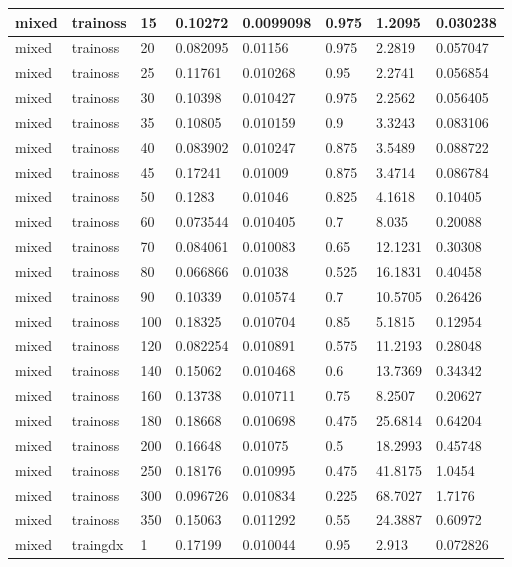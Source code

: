 \begin{longtable}{llllllll}
mixed & trainoss & 15 & 0.10272 & 0.0099098 & 0.975 & 1.2095 & 0.030238 \\ \hline 
mixed & trainoss & 20 & 0.082095 & 0.01156 & 0.975 & 2.2819 & 0.057047 \\ \hline 
mixed & trainoss & 25 & 0.11761 & 0.010268 & 0.95 & 2.2741 & 0.056854 \\ \hline 
mixed & trainoss & 30 & 0.10398 & 0.010427 & 0.975 & 2.2562 & 0.056405 \\ \hline 
mixed & trainoss & 35 & 0.10805 & 0.010159 & 0.9 & 3.3243 & 0.083106 \\ \hline 
mixed & trainoss & 40 & 0.083902 & 0.010247 & 0.875 & 3.5489 & 0.088722 \\ \hline 
mixed & trainoss & 45 & 0.17241 & 0.01009 & 0.875 & 3.4714 & 0.086784 \\ \hline 
mixed & trainoss & 50 & 0.1283 & 0.01046 & 0.825 & 4.1618 & 0.10405 \\ \hline 
mixed & trainoss & 60 & 0.073544 & 0.010405 & 0.7 & 8.035 & 0.20088 \\ \hline 
mixed & trainoss & 70 & 0.084061 & 0.010083 & 0.65 & 12.1231 & 0.30308 \\ \hline 
mixed & trainoss & 80 & 0.066866 & 0.01038 & 0.525 & 16.1831 & 0.40458 \\ \hline 
mixed & trainoss & 90 & 0.10339 & 0.010574 & 0.7 & 10.5705 & 0.26426 \\ \hline 
mixed & trainoss & 100 & 0.18325 & 0.010704 & 0.85 & 5.1815 & 0.12954 \\ \hline 
mixed & trainoss & 120 & 0.082254 & 0.010891 & 0.575 & 11.2193 & 0.28048 \\ \hline 
mixed & trainoss & 140 & 0.15062 & 0.010468 & 0.6 & 13.7369 & 0.34342 \\ \hline 
mixed & trainoss & 160 & 0.13738 & 0.010711 & 0.75 & 8.2507 & 0.20627 \\ \hline 
mixed & trainoss & 180 & 0.18668 & 0.010698 & 0.475 & 25.6814 & 0.64204 \\ \hline 
mixed & trainoss & 200 & 0.16648 & 0.01075 & 0.5 & 18.2993 & 0.45748 \\ \hline 
mixed & trainoss & 250 & 0.18176 & 0.010995 & 0.475 & 41.8175 & 1.0454 \\ \hline 
mixed & trainoss & 300 & 0.096726 & 0.010834 & 0.225 & 68.7027 & 1.7176 \\ \hline 
mixed & trainoss & 350 & 0.15063 & 0.011292 & 0.55 & 24.3887 & 0.60972 \\ \hline 
mixed & traingdx & 1 & 0.17199 & 0.010044 & 0.95 & 2.913 & 0.072826 \\ \hline 

\end{longtable}
